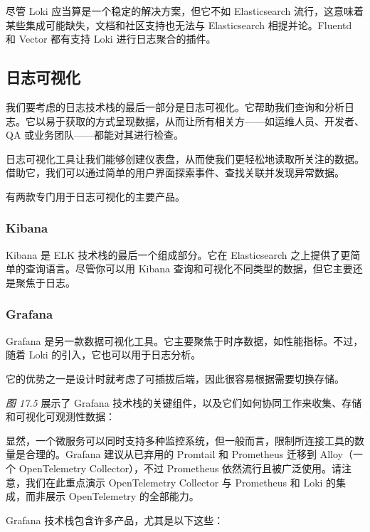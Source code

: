 \label{idx:1882}
尽管 Loki 应当算是一个稳定的解决方案，但它不如 Elasticsearch 流行，这意味着某些集成可能缺失，文档和社区支持也无法与 Elasticsearch 相提并论。Fluentd 和 Vector 都有支持 Loki 进行日志聚合的插件。

\subsection{日志可视化}

\label{idx:1883}
我们要考虑的日志技术栈的最后一部分是日志可视化。它帮助我们查询和分析日志。它以易于获取的方式呈现数据，从而让所有相关方——如运维人员、开发者、QA 或业务团队——都能对其进行检查。

日志可视化工具让我们能够创建仪表盘，从而使我们更轻松地读取所关注的数据。借助它，我们可以通过简单的用户界面探索事件、查找关联并发现异常数据。

有两款专门用于日志可视化的主要产品。

\subsubsection{Kibana}

\label{idx:1884}
\label{idx:1885}
Kibana 是 ELK 技术栈的最后一个组成部分。它在 Elasticsearch 之上提供了更简单的查询语言。尽管你可以用 Kibana 查询和可视化不同类型的数据，但它主要还是聚焦于日志。

\subsubsection{Grafana}

\label{idx:1886}
\label{idx:1887}
Grafana 是另一款数据可视化工具。它主要聚焦于时序数据，如性能指标。不过，随着 Loki 的引入，它也可以用于日志分析。

它的优势之一是设计时就考虑了可插拔后端，因此很容易根据需要切换存储。

\emph{图 17.5} 展示了 Grafana 技术栈的关键组件，以及它们如何协同工作来收集、存储和可视化可观测性数据：


\label{idx:1888}
显然，一个微服务可以同时支持多种监控系统，但一般而言，限制所连接工具的数量是合理的。Grafana 建议从已弃用的 Promtail 和 Prometheus 迁移到 Alloy（一个 OpenTelemetry Collector），不过 Prometheus 依然流行且被广泛使用。请注意，我们在此重点演示 OpenTelemetry Collector 与 Prometheus 和 Loki 的集成，而非展示 OpenTelemetry 的全部能力。

\label{idx:1889}
Grafana 技术栈包含许多产品，尤其是以下这些：

